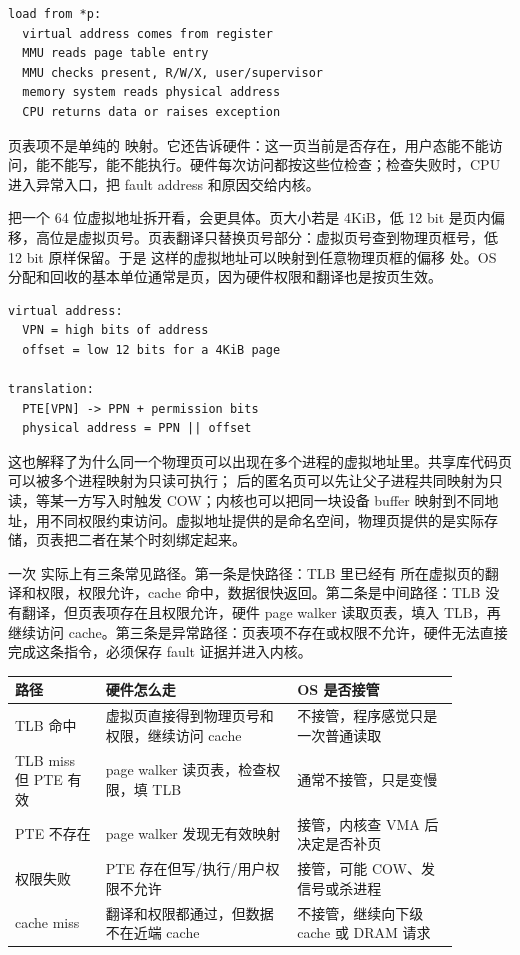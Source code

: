 \begin{lstlisting}
load from *p:
  virtual address comes from register
  MMU reads page table entry
  MMU checks present, R/W/X, user/supervisor
  memory system reads physical address
  CPU returns data or raises exception
\end{lstlisting}

页表项不是单纯的  映射。它还告诉硬件：这一页当前是否存在，用户态能不能访问，能不能写，能不能执行。硬件每次访问都按这些位检查；检查失败时，CPU 进入异常入口，把 fault address 和原因交给内核。

把一个 64 位虚拟地址拆开看，会更具体。页大小若是 4KiB，低 12 bit 是页内偏移，高位是虚拟页号。页表翻译只替换页号部分：虚拟页号查到物理页框号，低 12 bit 原样保留。于是  这样的虚拟地址可以映射到任意物理页框的偏移  处。OS 分配和回收的基本单位通常是页，因为硬件权限和翻译也是按页生效。

\begin{lstlisting}
virtual address:
  VPN = high bits of address
  offset = low 12 bits for a 4KiB page

translation:
  PTE[VPN] -> PPN + permission bits
  physical address = PPN || offset
\end{lstlisting}

这也解释了为什么同一个物理页可以出现在多个进程的虚拟地址里。共享库代码页可以被多个进程映射为只读可执行； 后的匿名页可以先让父子进程共同映射为只读，等某一方写入时触发 COW；内核也可以把同一块设备 buffer 映射到不同地址，用不同权限约束访问。虚拟地址提供的是命名空间，物理页提供的是实际存储，页表把二者在某个时刻绑定起来。

一次  实际上有三条常见路径。第一条是快路径：TLB 里已经有  所在虚拟页的翻译和权限，权限允许，cache 命中，数据很快返回。第二条是中间路径：TLB 没有翻译，但页表项存在且权限允许，硬件 page walker 读取页表，填入 TLB，再继续访问 cache。第三条是异常路径：页表项不存在或权限不允许，硬件无法直接完成这条指令，必须保存 fault 证据并进入内核。

\begin{longtable}{p{0.18\linewidth}p{0.38\linewidth}p{0.32\linewidth}}
\toprule
路径 & 硬件怎么走 & OS 是否接管 \\
\midrule
TLB 命中 & 虚拟页直接得到物理页号和权限，继续访问 cache & 不接管，程序感觉只是一次普通读取 \\
TLB miss 但 PTE 有效 & page walker 读页表，检查权限，填 TLB & 通常不接管，只是变慢 \\
PTE 不存在 & page walker 发现无有效映射 & 接管，内核查 VMA 后决定是否补页 \\
权限失败 & PTE 存在但写/执行/用户权限不允许 & 接管，可能 COW、发信号或杀进程 \\
cache miss & 翻译和权限都通过，但数据不在近端 cache & 不接管，继续向下级 cache 或 DRAM 请求 \\
\bottomrule
\end{longtable}

